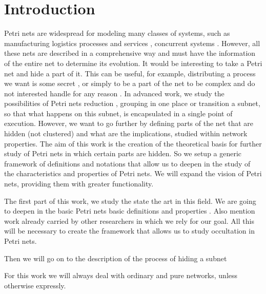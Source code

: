 
\chapter{Introduction} %

\label{Chapter1} %


Petri nets are widespread for modeling many
classes of systems, such as manufacturing logistics processes and services
\cite{guasch} \cite{jimenez}, concurrent systems \cite{jensen}. However, all these nets are described in a comprehensive way and must have the information of the entire net to determine
its evolution. It would be interesting to take a Petri net and
hide a part of it. This can be useful, for example,
distributing a process we want is some secret \cite{inigo},
or simply to be a part of the net to be complex and do not
interested handle for any reason \cite{jimenez}. In advanced work, we study the possibilities of Petri nets reduction \cite{xia}, grouping
in one place or transition a subnet, so that what happens
on this subnet, is encapsulated in a single point of execution. However,
we want to go further by defining parts of the net that are hidden (not clustered) and what are the implications, studied within
network properties. The aim of this work is the creation
of the theoretical basis for further study of Petri nets
in which certain parts are hidden. So we setup
a generic framework of definitions and notations that allow us to deepen
in the study of the characteristics and properties of Petri nets.
We will expand the vision of Petri nets, providing them with greater functionality.

The first part of this work, we study the state
the art in this field. We are going to deepen in the 
basic Petri nets basic definitions and properties \cite{murata}. Also mention work already carried
by other researchers in which we rely for
our goal. All this will be necessary to create the framework that allows us to study occultation in Petri nets.

Then we will go on to the description of the process of hiding a subnet

\begin{nota}
For this work we will always deal with ordinary and pure networks, unless otherwise expressly.
\end{nota}
